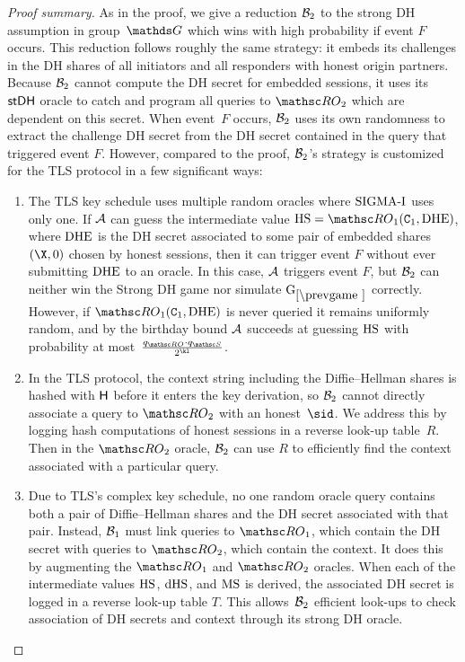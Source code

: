 \begin{proof}[Proof summary]
As in the \SIGMAI proof, we give a reduction $\mathcal{B}_2$ to the strong DH assumption in group~$\group$ which wins with high probability if event $F$ occurs. 
This reduction follows roughly the same strategy: it embeds its challenges in the DH shares of all initiators and all responders with honest origin partners. 
Because $\mathcal{B}_2$ cannot compute the DH secret for embedded sessions, it uses its $\mathsf{stDH}$ oracle to catch and program all queries to $\RO_2$ which are dependent on this secret. When event~$F$ occurs, $\mathcal{B}_2$ uses its own randomness to extract the challenge DH secret from the DH secret contained in the query that triggered event $F$.
However, compared to the \SIGMAI proof, $\mathcal{B}_2$'s strategy is customized for the TLS protocol in a few significant ways: 
\begin{enumerate}
	\item The TLS key schedule uses multiple random oracles where $\mbox{SIGMA-I}$ uses only one.
	If $\mathcal{A}$ can guess the intermediate value $\HS = \RO_1(\constant[1],\DHE)$, where $\mathrm{DHE}$ is the DH secret associated to some pair of embedded shares $(\X,\Y)$ chosen by honest sessions, then it can trigger event $F$ without ever submitting $\mathrm{DHE}$ to an oracle.
	In this case, $\mathcal{A}$ triggers event $F$, but $\mathcal{B}_2$ can neither win the Strong DH game nor simulate $\prevGm$ correctly.
	However, if $\RO_1(\constant[1],\DHE)$ is never queried it remains uniformly random, and by the birthday bound $\mathcal{A}$ succeeds at guessing $\mathrm{HS}$ with probability at most~$\frac{\qRO \cdot \qSend}{2^{\kl}}$. 

	\item In the TLS protocol, the context string including the Diffie--Hellman shares is hashed with $\mathsf{H}$ before it enters the key derivation, so $\mathcal{B}_2$ cannot directly associate a query to $\RO_2$ with an honest~$\sid$.
	We address this by logging hash computations of honest sessions in a reverse look-up table~$R$.
	Then in the $\RO_2$ oracle, $\mathcal{B}_2$ can use $R$ to efficiently find the context associated with a particular query.
	
	\item Due to TLS's complex key schedule, no one random oracle query contains both a pair of Diffie--Hellman shares and the DH secret associated with that pair. Instead, $\mathcal{B}_1$ must link queries to $\RO_1$, which contain the DH secret with queries to $\RO_2$, which contain the context. It does this by augmenting the $\RO_1$ and $\RO_2$ oracles.
	When each of the intermediate values $\mathrm{HS}$, $\mathrm{dHS}$, and $\mathrm{MS}$ is derived, the associated DH secret is logged in a reverse look-up table $T$.
	This allows~$\mathcal{B}_2$ efficient look-ups to check association of DH secrets and context through its strong DH oracle.
	

\end{enumerate}
\end{proof}
